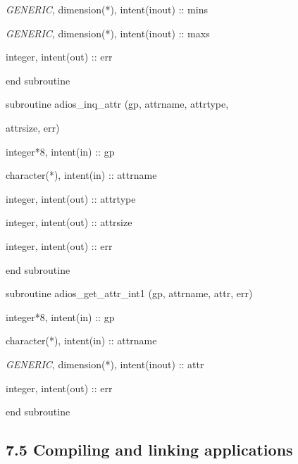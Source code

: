 \vspace{10pt}
\textit{GENERIC}, dimension(*), intent(inout) :: mins

\vspace{10pt}
\textit{GENERIC}, dimension(*), intent(inout) :: maxs

\vspace{10pt}
integer,        intent(out) :: err

\vspace{10pt}
\parindent=0pt
end subroutine

\vspace{22pt}
subroutine adios\_inq\_attr (gp, attrname, attrtype, 

\vspace{10pt}
\parindent=97pt
attrsize, err)

\vspace{10pt}
\parindent=36pt
integer*8,      intent(in) :: gp

\vspace{10pt}
character(*),   intent(in)  :: attrname

\vspace{10pt}
integer,        intent(out) :: attrtype

\vspace{10pt}
integer,        intent(out) :: attrsize

\vspace{10pt}
integer,        intent(out) :: err

\vspace{10pt}
\parindent=0pt
end subroutine

\vspace{22pt}
subroutine adios\_get\_attr\_int1 (gp, attrname, attr, err)

\vspace{10pt}
\parindent=36pt
integer*8,      intent(in)  :: gp

\vspace{10pt}
character(*),   intent(in)  :: attrname

\vspace{10pt}
\textit{GENERIC}, dimension(*), intent(inout) :: attr

\vspace{10pt}
integer,        intent(out) :: err 

\vspace{10pt}
\parindent=0pt
end subroutine\label{HToc182553414}

\vspace{22pt}
\subsection*{{\large 7.5 }{\large \textbf{Compiling and linking applications}}}


